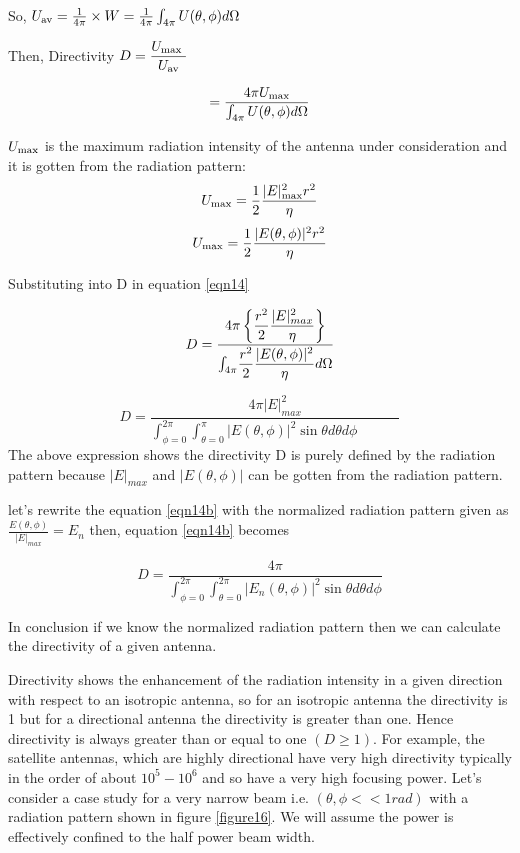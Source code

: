 \begin{enumerate}
So, $U_{\textnormal{av}}=\frac{1}{4\pi} \times W = \frac{1}{4\pi}\int_{4\pi}U(\theta ,\phi)d\Omega$

Then, Directivity $D=\dfrac{U_{\textnormal{max
}}}{U_{\textnormal{av}}}$ 

\begin{equation}
= \frac{4\pi U_{\textnormal{max}}}{\int_{4\pi}U(\theta,\phi)d\Omega}
\label{eqn14}
\end{equation}

$U_{\textnormal{max}}$ is the maximum radiation intensity of the antenna under consideration and it is gotten from the radiation pattern:
$$U_{\textnormal{max}}=\frac{1}{2}\frac{|E|^{2}_{\textnormal{max}}r^{2}}{\eta}$$
$$U_{\textnormal{max}}=\frac{1}{2}\frac{|E(\theta,\phi)|^{2}r^{2}}{\eta}$$

Substituting into D in equation \ref{eqn14}

$$
D = \dfrac{4\pi\left\{\dfrac{r^2}{2}
	\dfrac{|E|^2_{max}}{\eta}\right\}}
{{\Large \int_{4\pi}}\dfrac{r^2}{2}
	\dfrac{|E(\theta,\phi)|^2}{\eta}d\Omega }
$$

\begin{equation}
D = \dfrac{4\pi|E|^2_{max}}{\int^{ 2\pi}_{\phi=0}\int^{ \pi}_{\theta=0}|E(\theta,\phi)|^2\sin\theta d\theta d\phi \qquad \quad}
\label{eqn14b}
\end{equation}
The above expression shows the directivity D is purely defined by the radiation pattern because $|E|_{max}$ and $|E(\theta, \phi)|$ can be gotten from the radiation pattern.

let's rewrite the equation \ref{eqn14b} with the normalized radiation pattern given as $\frac{E(\theta, \phi)}{|E|_{max}} = E_n$ then, equation \ref{eqn14b} becomes

\begin{equation}
D = \frac{4\pi}{\int_{\phi = 0}^{2\pi}\int_{\theta = 0}^{2\pi}|E_n(\theta, \phi)|^2\sin\theta d\theta d\phi}
\label{eqn14c}
\end{equation}

In conclusion if we know the normalized radiation pattern then we can calculate the directivity of a given antenna.
		
Directivity shows the enhancement of the radiation intensity in a given direction with respect to an isotropic antenna, so for an isotropic antenna the directivity is 1 but for a directional antenna the directivity is greater than one. Hence directivity is always greater than or equal to one $(D\geq 1)$.
For example, the satellite antennas, which are highly directional have very high directivity typically in the order of about $10^{5}-10^{6}$ and so have a very high focusing power.	Let's consider a case study for a very narrow beam i.e. $(\theta, \phi << 1rad)$ with a radiation pattern shown in figure \ref{figure16}. We will assume the power is effectively confined to the half power beam width.  


\end{enumerate}
